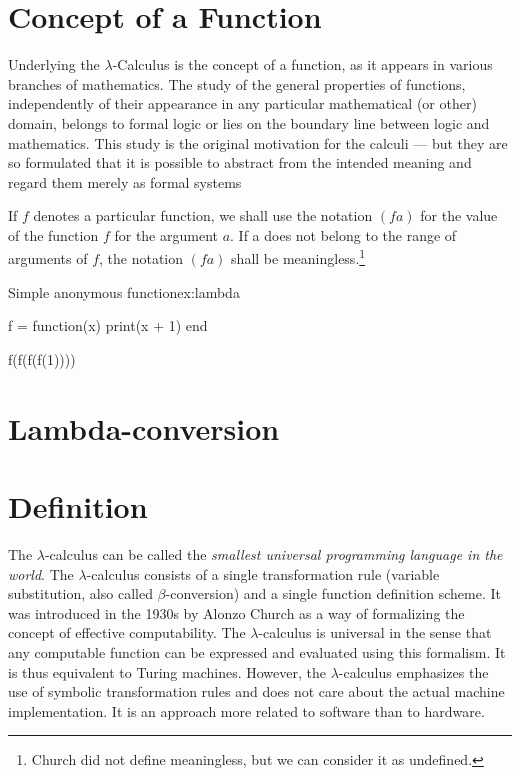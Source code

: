 \section{Concept of a Function}
Underlying the $\lambda$-Calculus is the concept of a function, as it appears in various branches of mathematics. The study of the general properties of functions,
independently of their appearance in any particular mathematical
(or other) domain, belongs to formal logic or lies on the boundary
line between logic and mathematics. This study is the original motivation for the calculi --- but they are so formulated
that it is possible to abstract from the intended meaning and
regard them merely as formal systems

If $f$ denotes a particular function, we shall use the notation
$(fa)$ for the value of the function $f$ for the argument
$a$. If a does not belong to the range of arguments of $f$, the
notation $(fa)$ shall be meaningless.\footnote{Church did not define meaningless, but we can consider it as undefined.}

\begin{texexample}{Simple anonymous function}{ex:lambda}
\begin{luacode}
f = function(x) 
      print(x + 1)
    end 

f(f(f(f(1))))    
\end{luacode}
\end{texexample}


\section{Lambda-conversion}

\section{Definition}

The $\lambda$-calculus can be called the {\it smallest universal programming language in the world\/}. The $\lambda$-calculus consists of a single transformation rule (variable substitution, also called $\beta$-conversion) and a single function definition scheme. It was introduced in the 1930s by Alonzo Church as a way of formalizing the concept of effective computability. The $\lambda$-calculus is universal in the sense that any computable function can be expressed and evaluated using this formalism. It is thus equivalent to Turing machines. However, the $\lambda$-calculus emphasizes the use of symbolic transformation rules and does not care about the actual machine implementation. It is an approach more related to software than to hardware. 

